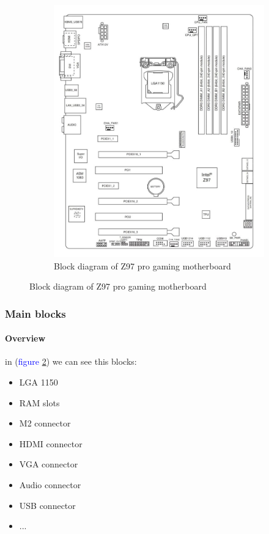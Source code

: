 \documentclass[
	12pt, %
]{beamer}
\begin{document}
\begin{frame}
\begin{figure}
\begin{subfigure}[b]{0.3\textwidth}
			\includegraphics[width=1.1\linewidth]{Images/img3.jpg}
			\caption{Block diagram of Z97 pro gaming motherboard}
			\label{Z97 sch}
		\end{subfigure}
	\end{figure}
\end{frame}




\begin{frame}
	\frametitle{Main blocks}
	\framesubtitle{Overview}
	in (\textcolor{blue}{figure \ref{Z97 sch}}) we can see this blocks: 
	\begin{itemize}
		\item LGA 1150
		\item RAM slots
		\item M2 connector
		\item HDMI connector
		\item VGA connector
		\item Audio connector
		\item USB connector
		\item ...
	\end{itemize}
\end{frame}
\end{document}
